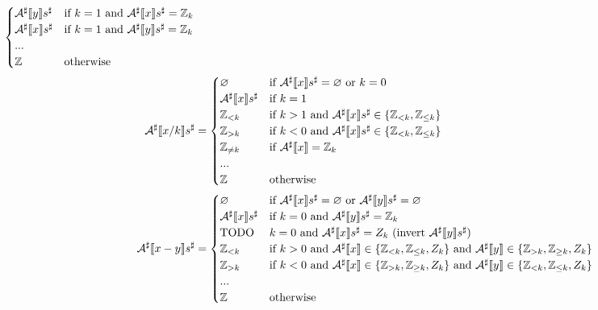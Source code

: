 \begin{exercise}
\begin{align*}
\begin{cases}
            \Asharp{y} s^\sharp & \text{if } k = 1 \text{ and } \Asharp{x} s^\sharp = \Z_k \\
            \Asharp{x} s^\sharp & \text{if } k = 1 \text{ and } \Asharp{y} s^\sharp = \Z_k \\
            ... \\
            \Z & \text{otherwise}
        \end{cases} \\
        \Asharp{x / k} s^\sharp &= \begin{cases}
            \varnothing & \text{if } \Asharp{x} s^\sharp = \varnothing \text{ or } k = 0 \\
            \Asharp{x} s^\sharp & \text{if } k = 1 \\
            \Z_{< k} & \text{if } k > 1 \text{ and } \Asharp{x} s^\sharp \in \{ \Z_{< k}, \Z_{\leq k} \} \\
            \Z_{> k} & \text{if } k < 0 \text{ and } \Asharp{x} s^\sharp \in \{ \Z_{< k}, \Z_{\leq k} \} \\
            \Z_{\neq k} & \text{if } \Asharp{x} = \Z_k \\
            ... \\
            \Z & \text{otherwise}
        \end{cases} \\
        \Asharp{x - y} s^\sharp &= \begin{cases}
            \varnothing & \text{if } \Asharp{x} s^\sharp = \varnothing \text{ or } \Asharp{y} s^\sharp = \varnothing \\
            \Asharp{x} s^\sharp & \text{if } k = 0 \text{ and } \Asharp{y} s^\sharp = \Z_k \\
            \text{TODO} & \text{$k = 0$ and $\Asharp{x} s^\sharp = Z_k$ (invert $\Asharp{y} s^\sharp$)} \\
            \Z_{< k} & \text{if } k > 0 \text{ and } \Asharp{x} \in \{ \Z_{< k}, \Z_{\leq k}, Z_k \} \text{ and } \Asharp{y} \in \{ \Z_{> k}, \Z_{\geq k}, Z_k \} \\
            \Z_{> k} & \text{if } k < 0 \text{ and } \Asharp{x} \in \{ \Z_{> k}, \Z_{\geq k}, Z_k \} \text{ and } \Asharp{y} \in \{ \Z_{< k}, \Z_{\leq k}, Z_k \} \\
            ... \\
            \Z & \text{otherwise}
        \end{cases} \\
    \end{align*}
\end{exercise}
